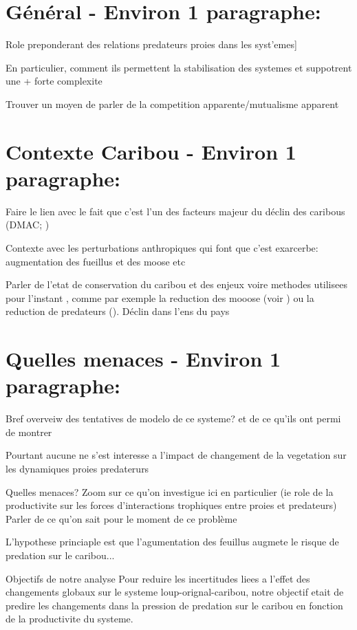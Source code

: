 
\section{Général - Environ 1 paragraphe:}
Role preponderant des relations predateurs proies dans les syst'emes]

En particulier, comment ils permettent la stabilisation des systemes et suppotrent une + forte complexite

Trouver un moyen de parler de la competition apparente/mutualisme apparent


\section{Contexte Caribou - Environ 1 paragraphe:}

Faire le lien avec le fait que c'est l'un des facteurs majeur du déclin des caribous (DMAC; \cite{neufeld2020})

Contexte avec les perturbations anthropiques qui font que c'est exarcerbe: augmentation des fueillus et des moose etc

Parler de l'etat de conservation du caribou et des enjeux voire methodes utilisees pour l'instant , comme par exemple la reduction des mooose (voir \cite{serrouya2019}) ou la reduction de predateurs (\cite{hervieux2014}). 
Déclin dans l'ens du pays



\section{Quelles menaces - Environ 1 paragraphe:}

Bref overveiw des tentatives de modelo de ce systeme? \cite{serrouya2020} et de ce qu'ils ont permi de montrer 


Pourtant aucune ne s'est interesse a l'impact de changement de la vegetation sur les dynamiques proies predaterurs

Quelles menaces?
Zoom sur ce qu'on investigue ici en particulier (ie role de la productivite sur les forces d'interactions trophiques entre proies et predateurs)
Parler de ce qu'on sait pour le moment de ce problème \cite{chaguaceda2021}

L'hypothese princiaple est que l'agumentation des feuillus augmete le risque de predation sur le caribou...

Objectifs de notre analyse
Pour reduire les incertitudes liees a l'effet des changements globaux sur le systeme loup-orignal-caribou, notre objectif etait de predire les changements dans la pression de predation sur le caribou en fonction de la productivite du systeme. 

